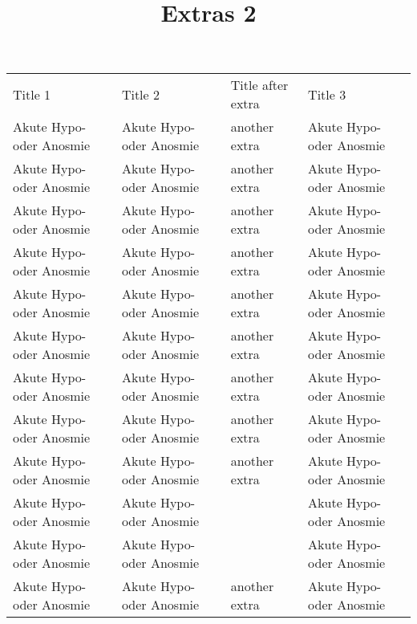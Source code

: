 \documentclass{article}
\begin{document}
\title{Extras 2}

\maketitle


\begin{tabu} to \textwidth { |X|X|X|X| }
\hline



Title 1 & Title 2 & Title after extra & Title 3
 \\


Akute Hypo- oder Anosmie & Akute Hypo- oder Anosmie & another extra  & Akute Hypo- oder Anosmie
 \\


Akute Hypo- oder Anosmie & Akute Hypo- oder Anosmie & another extra  & Akute Hypo- oder Anosmie
 \\


Akute Hypo- oder Anosmie & Akute Hypo- oder Anosmie & another extra  & Akute Hypo- oder Anosmie
 \\


Akute Hypo- oder Anosmie & Akute Hypo- oder Anosmie & another extra  & Akute Hypo- oder Anosmie
 \\


Akute Hypo- oder Anosmie & Akute Hypo- oder Anosmie & another extra  & Akute Hypo- oder Anosmie
 \\


Akute Hypo- oder Anosmie & Akute Hypo- oder Anosmie & another extra  & Akute Hypo- oder Anosmie
 \\


Akute Hypo- oder Anosmie & Akute Hypo- oder Anosmie & another extra  & Akute Hypo- oder Anosmie
 \\


Akute Hypo- oder Anosmie & Akute Hypo- oder Anosmie & another extra  & Akute Hypo- oder Anosmie
 \\


Akute Hypo- oder Anosmie & Akute Hypo- oder Anosmie & another extra  & Akute Hypo- oder Anosmie
 \\


Akute Hypo- oder Anosmie & Akute Hypo- oder Anosmie &  & Akute Hypo- oder Anosmie
 \\


Akute Hypo- oder Anosmie & Akute Hypo- oder Anosmie &  & Akute Hypo- oder Anosmie
 \\


Akute Hypo- oder Anosmie & Akute Hypo- oder Anosmie & another extra  & Akute Hypo- oder Anosmie
 \\



\end{tabu}
\end{document}
